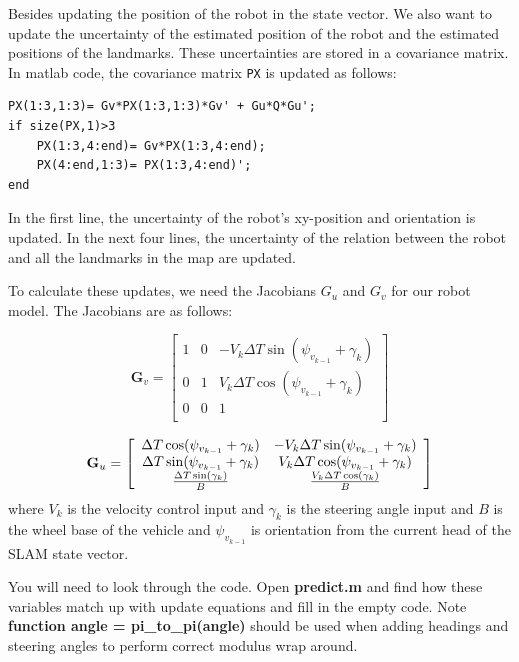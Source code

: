 \documentclass[a4, 10pt]{article}
\begin{document}
Besides updating the position of the robot in the state vector. We
also want to update the uncertainty of the estimated position of the
robot and the estimated positions of the landmarks. These
uncertainties are stored in a covariance matrix. In matlab code, the
covariance matrix \verb|PX| is updated as follows:

\begin{verbatim}
PX(1:3,1:3)= Gv*PX(1:3,1:3)*Gv' + Gu*Q*Gu';
if size(PX,1)>3
    PX(1:3,4:end)= Gv*PX(1:3,4:end);
    PX(4:end,1:3)= PX(1:3,4:end)';
end 
\end{verbatim}
In the first line, the uncertainty of the robot's xy-position and
orientation is updated. In the next four lines, the uncertainty of the
relation between the robot and all the landmarks in the map are
updated.

To calculate these updates, we need the Jacobians $G_u$ and $G_v$ for
our robot model. The Jacobians are as follows:

\newcommand{\vtc}{V_k \Delta T \cos(\psi_{v_{k-1}} +\gamma_k)}
\newcommand{\vts}{V_k \Delta T \sin(\psi_{v_{k-1}} +\gamma_k)}

\begin{equation}
\mathbf{G}_v=
\left[
\begin{array}{ccc}
1& 0& -\vts \\
0 &1& \vtc\\
0 &0& 1\\
\end{array}
\right]
\end{equation}

\begin{equation}
\mathbf{G}_u=
\left[
\begin{array}{cc}
\Delta T \cos(\psi_{v_{k-1}} +\gamma_k)&  -\vts \\
\Delta T \sin(\psi_{v_{k-1}} +\gamma_k) & \vtc\\
\Delta T \sin(\gamma_k)\over B & V_k\Delta T \cos(\gamma_k)\over B\\
\end{array}
\right]
\end{equation}
where $V_k$ is the velocity control input and $\gamma_k$ is the steering angle input and $B$ is the wheel base of the vehicle and $\psi_{v_{k-1}} $ is orientation from the current head of the SLAM state vector. 


You will need to look through the code. Open \textbf{predict.m} and find how these variables match up with update equations and fill in the empty code. Note \textbf{function angle = pi\_to\_pi(angle)}
should be used when adding headings and steering angles to perform correct modulus wrap around.
\end{document}
